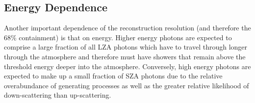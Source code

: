 \documentclass[main.tex]{subfiles}
\begin{document}
\subsection{Energy Dependence}
Another important dependence of the reconstruction resolution (and therefore the 68\% containment) is that on energy. Higher energy photons are expected to comprise a large fraction of all LZA photons which have to travel through longer through the atmosphere and therefore must have showers that remain above the threshold energy deeper into the atmosphere. Conversely, high energy photons are expected to make up a small fraction of SZA photons due to the relative overabundance of generating processes as well as the greater relative likelihood of down-scattering than up-scattering.
\end{document}
